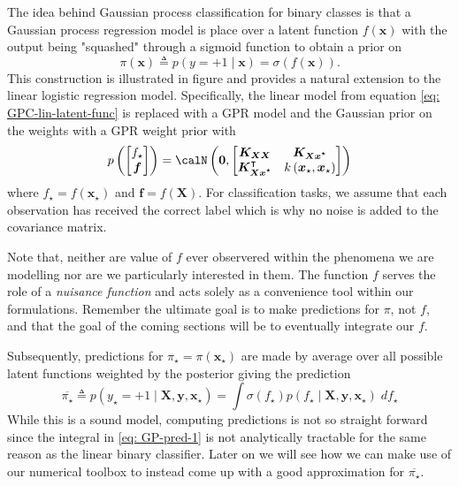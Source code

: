 The idea behind Gaussian process classification for binary classes is that a Gaussian process regression model is place over a latent function $f \left( \bm{x} \right)$ with the output being "squashed" through a sigmoid function to obtain a prior on
\begin{equation*}
    \pi \left( \bm{x} \right) \triangleq p \left( y=+1 \mid \bm{x} \right) = \sigma \left( f \left( \bm{x} \right) \right).
\end{equation*}
This construction is illustrated in figure and provides a natural extension to the linear logistic regression model. Specifically, the linear model from equation \ref{eq: GPC-lin-latent-func} is replaced with a GPR model and the Gaussian prior on the weights with a GPR weight prior with
\begin{equation*}
    p \left(
    \begin{bmatrix}
            f_{\star} \\
            \bm{f}
        \end{bmatrix}
    \right)
    =
    \calN \left( \bm{0} ,
    \begin{bmatrix}
        \bm{K_{XX}}                     & \bm{K_{Xx^{\star}}}                             \\
        \bm{K_{Xx^{\star}}}^{\intercal} & k \left( \bm{x}_{\star}, \bm{x}_{\star} \right)
    \end{bmatrix}
    \right)
\end{equation*}
where $f_{\star} = f ( \bm{x}_{\star} )$ and $\bm{f} = f \left( \bm{X} \right)$. For classification tasks, we assume that each observation has received the correct label which is why no noise is added to the covariance matrix.

Note that, neither are value of $f$ ever observered within the phenomena we are modelling nor are we particularly interested in them. The function $f$ serves the role of a {\it nuisance function} and acts solely as a convenience tool within our formulations. Remember the ultimate goal is to make predictions for $\pi$, not $f$, and that the goal of the coming sections will be to eventually integrate our $f$.

Subsequently, predictions for $\pi_{\star} = \pi \left( \bm{x}_{\star} \right)$ are made by average over all possible latent functions weighted by the posterior giving the prediction
\begin{equation} \label{eq: GP-pred-1}
    \overline{\pi_{\star}} \triangleq p \left( y_{\star} = +1 \mid \bm{X} , \bm{y} , \bm{x}_{\star} \right) = \int \sigma \left( f_{\star} \right) p \left( f_{\star} \mid \bm{X} , \bm{y} , \bm{x}_{\star} \right) \; d f_{\star}
\end{equation}
While this is a sound model, computing predictions is not so straight forward since the integral in \ref{eq: GP-pred-1} is not analytically tractable for the same reason as the linear binary classifier. Later on we will see how we can make use of our numerical toolbox to instead come up with a good approximation for $\overline{\pi_{\star}}$.

